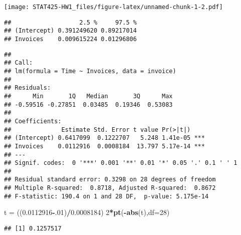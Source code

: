 \documentclass[]{article}
\newenvironment{Shaded}{\begin{snugshade}}{\end{snugshade}}
\newcommand{\KeywordTok}[1]{\textcolor[rgb]{0.13,0.29,0.53}{\textbf{#1}}}
\newcommand{\DataTypeTok}[1]{\textcolor[rgb]{0.13,0.29,0.53}{#1}}
\newcommand{\DecValTok}[1]{\textcolor[rgb]{0.00,0.00,0.81}{#1}}
\newcommand{\FloatTok}[1]{\textcolor[rgb]{0.00,0.00,0.81}{#1}}
\newcommand{\StringTok}[1]{\textcolor[rgb]{0.31,0.60,0.02}{#1}}
\newcommand{\CommentTok}[1]{\textcolor[rgb]{0.56,0.35,0.01}{\textit{#1}}}
\newcommand{\OperatorTok}[1]{\textcolor[rgb]{0.81,0.36,0.00}{\textbf{#1}}}
\newcommand{\NormalTok}[1]{#1}
\begin{document}
\texttt{[image: STAT425-HW1\_files/figure-latex/unnamed-chunk-1-2.pdf]}

\begin{Shaded}
\end{Shaded}

\begin{verbatim}
##                   2.5 %     97.5 %
## (Intercept) 0.391249620 0.89217014
## Invoices    0.009615224 0.01296806
\end{verbatim}

\begin{Shaded}
\end{Shaded}

\begin{verbatim}
## 
## Call:
## lm(formula = Time ~ Invoices, data = invoice)
## 
## Residuals:
##      Min       1Q   Median       3Q      Max 
## -0.59516 -0.27851  0.03485  0.19346  0.53083 
## 
## Coefficients:
##              Estimate Std. Error t value Pr(>|t|)    
## (Intercept) 0.6417099  0.1222707   5.248 1.41e-05 ***
## Invoices    0.0112916  0.0008184  13.797 5.17e-14 ***
## ---
## Signif. codes:  0 '***' 0.001 '**' 0.01 '*' 0.05 '.' 0.1 ' ' 1
## 
## Residual standard error: 0.3298 on 28 degrees of freedom
## Multiple R-squared:  0.8718, Adjusted R-squared:  0.8672 
## F-statistic: 190.4 on 1 and 28 DF,  p-value: 5.175e-14
\end{verbatim}

\begin{Shaded}
\begin{Highlighting}[]
\NormalTok{t =}\StringTok{ }\NormalTok{((}\FloatTok{0.0112916}\OperatorTok{-}\NormalTok{.}\DecValTok{01}\NormalTok{)}\OperatorTok{/}\FloatTok{0.0008184}\NormalTok{)}
\DecValTok{2}\OperatorTok{*}\KeywordTok{pt}\NormalTok{(}\OperatorTok{-}\KeywordTok{abs}\NormalTok{(t),}\DataTypeTok{df=}\DecValTok{28}\NormalTok{)}
\end{Highlighting}
\end{Shaded}

\begin{verbatim}
## [1] 0.1257517
\end{verbatim}
\end{document}
